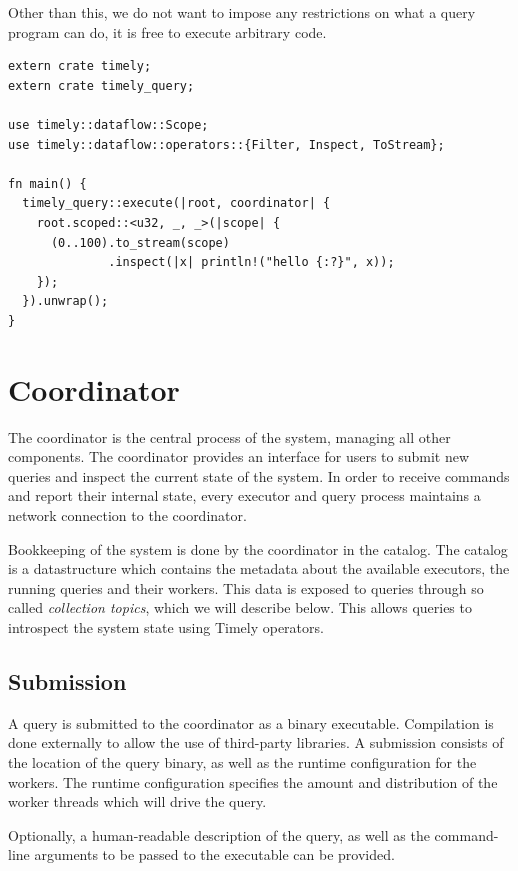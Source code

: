Other than this, we do not want to impose any restrictions on what a query program
can do, it is free to execute arbitrary code.

\begin{lstlisting}[caption={[Example query.]Example query which prints out a stream of integers.}]
extern crate timely;
extern crate timely_query;

use timely::dataflow::Scope;
use timely::dataflow::operators::{Filter, Inspect, ToStream};

fn main() {
  timely_query::execute(|root, coordinator| {
    root.scoped::<u32, _, _>(|scope| {
      (0..100).to_stream(scope)
              .inspect(|x| println!("hello {:?}", x));
    });
  }).unwrap();
}
\end{lstlisting}

\section{Coordinator}

The coordinator is the central process of the system, managing all other
components. 
The coordinator provides an interface for users to submit new queries and
inspect the current state of the system. In order to receive commands and
report their internal state, every executor and query process maintains a
network connection to the coordinator.

Bookkeeping of the system is done by the coordinator in the catalog. The
catalog is a datastructure which contains the metadata about the available
executors, the running queries and their workers. This data is exposed to
queries through so called \emph{collection topics}, which we will describe
below. This allows queries to introspect the system state using Timely operators.

\subsection{Submission}

A query is submitted to the coordinator as a binary executable. Compilation
is done externally to allow the use of third-party libraries. A submission
consists of the location of the query binary, as well as the runtime
configuration for the workers. The runtime configuration specifies the amount
and distribution of the worker threads which will drive the query.

Optionally, a human-readable description of the query,
as well as the command-line arguments to be passed to the executable can be
provided.

